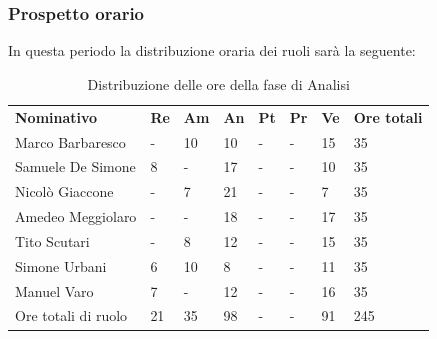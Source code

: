 \subsubsection{Prospetto orario}
In questa periodo la distribuzione oraria dei ruoli sarà la seguente:
\begin{center}
    \begin{table}[ht!]
        \centering
        \caption{Distribuzione delle ore della fase di Analisi}
        \vspace{5px}
        \renewcommand{\arraystretch}{1.8}
        \begin{tabular}{p{100px} p{20px} p{20px} p{20px} p{20px} p{20px} p{20px} p{50px} }
            \rowcolor{logo!70} \textbf{Nominativo} & \textbf{Re} & \textbf{Am} & \textbf{An} & \textbf{Pt} & \textbf{Pr} & \textbf{Ve} & \textbf{Ore totali} \\
            Marco Barbaresco                       & -           & 10          & 10          & -           & -           & 15          & 35                  \\
            Samuele De Simone                      & 8           & -           & 17          & -           & -           & 10          & 35                  \\
            Nicolò Giaccone                        & -           & 7           & 21          & -           & -           & 7           & 35                  \\
            Amedeo Meggiolaro                      & -           & -           & 18          & -           & -           & 17          & 35                  \\
            Tito Scutari                           & -           & 8           & 12          & -           & -           & 15          & 35                  \\
            Simone Urbani                          & 6           & 10          & 8           & -           & -           & 11          & 35                  \\
            Manuel Varo                            & 7           & -           & 12          & -           & -           & 16          & 35                  \\
            Ore totali di ruolo                    & 21          & 35          & 98          & -           & -           & 91          & 245                 \\
        \end{tabular}
    \end{table}
\end{center}

